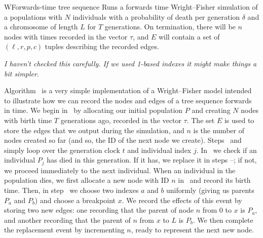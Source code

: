 \documentclass{article}
\newcommand{\jk}[1]{{\em \color{red} #1}}
\begin{document}
\begin{taocpalg}{W}{Forwards-time tree sequence}
{Runs a forwards time Wright--Fisher simulation of a populations with $N$
individuals with a probability of death per generation $\delta$ and a chromosome of length
$L$ for $T$ generations. On termination, there will be $n$ nodes with times recorded
in the vector $\tau$, and $E$ will contain a set of $(\ell, r, p, c)$ tuples
describing the recorded edges.
}




\algstep{W4.}{Mortality.}{ If $\randomuniform([0, 1)) \geq \delta$ go to \algref{W8}.
}


\algstep{W6.}{Choose parents.}{Set $a \leftarrow \randomuniform(\{0, \dots, N - 1\})$,
    $b \leftarrow \randomuniform(\{0, \dots, N - 1\})$ and $x \leftarrow \randomuniform([0, L))$.
}



\jk{I haven't checked this carefully. If we used 1-based indexes it might make things a bit
simpler}.
\end{taocpalg}

Algorithm~ is a very simple implementation of a Wright--Fisher model
intended to illustrate how we can record the nodes and edges of a tree sequence
forwards in time. We begin in~ by allocating our initial population $P$
and creating $N$ nodes with birth time $T$ generations ago, recorded in the
vector $\tau$. The set $E$ is used to store the edges that we output during the
simulation, and $n$ is the number of nodes created so far (and so, the ID of
the next node we create). Steps~ and~ simply loop over
the generation clock $t$ and individual index $j$. In~ we check if
an individual $P_j$ has died in this generation. If it has, we replace it in
steps --; if not, we proceed immediately to the next
individual. When an individual in the population dies, we first allocate
a new node with ID $n$ in~ and record its birth time. Then,
in step~ we choose two indexes $a$ and $b$ uniformly (giving us
parents $P_a$ and $P_b$) and choose a breakpoint $x$. We record the effects of this
event by storing two new edges: one recording that the parent of node $n$
from $0$ to $x$ is $P_a$, and another recording that the parent of $n$
from $x$ to $L$ is $P_b$. We then complete the replacement event by incrementing
$n$, ready to represent the next new node.
\end{document}
